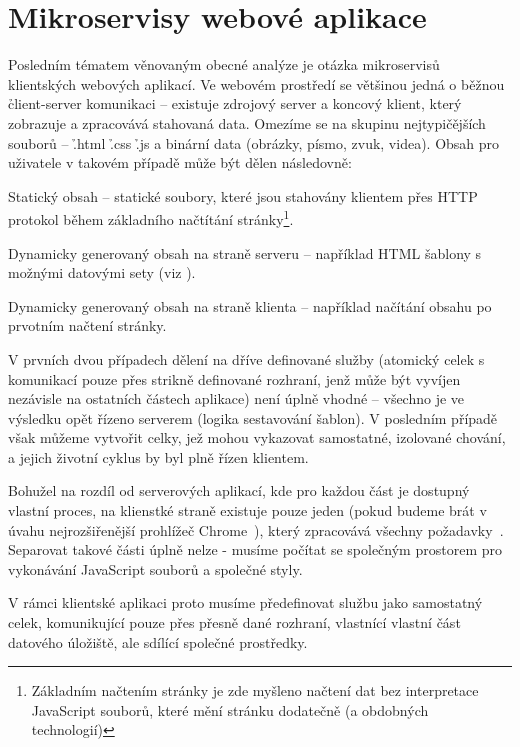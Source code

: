 
\section{Mikroservisy webové aplikace}\label{sec:msa-client}

Posledním tématem věnovaným obecné analýze  je otázka mikroservisů klientských webových aplikací.
Ve webovém prostředí se většinou jedná o běžnou \h{client-server} komunikaci – existuje zdrojový server a koncový klient, který zobrazuje a zpracovává stahovaná data.
Omezíme se na skupinu nejtypičějších souborů – \h{.html} \h{.css} \h{.js} a binární data (obrázky, písmo, zvuk, videa).
Obsah pro uživatele v takovém případě může být dělen následovně:

\begin{dl}
   \item[Statický obsah] – statické soubory, které jsou stahovány klientem přes HTTP protokol během základního načtítání stránky\footnote{Základním načtením stránky je zde myšleno načtení dat bez interpretace JavaScript souborů, které mění stránku dodatečně (a obdobných technologií)}.
   \item[Dynamicky generovaný obsah na straně serveru] – například HTML šablony s možnými datovými sety (viz ).
   \item[Dynamicky generovaný obsah na straně klienta] – například  načítání obsahu po prvotním načtení stránky.
\end{dl}

V prvních dvou případech dělení na dříve definované služby (atomický celek s komunikací pouze přes strikně definované rozhraní, jenž může být vyvíjen nezávisle na ostatních částech aplikace) není úplně vhodné – všechno je ve výsledku opět řízeno serverem (logika sestavování šablon).
V posledním případě však můžeme vytvořit celky, jež mohou vykazovat samostatné, izolované chování, a jejich životní cyklus by byl plně řízen klientem.

Bohužel na rozdíl od serverových aplikací, kde pro každou část je dostupný vlastní proces, na klienstké straně existuje pouze jeden (pokud budeme brát v úvahu nejrozšiřenější prohlížeč Chrome~\cite{browserstats}), který zpracovává všechny požadavky~\cite{chromiumprocesses}.
Separovat takové části úplně nelze - musíme počítat se společným prostorem pro vykonávání JavaScript souborů a společné  styly.

V rámci klientské aplikaci proto musíme předefinovat službu jako samostatný celek, komunikující pouze přes přesně dané rozhraní, vlastnící vlastní část datového úložiště, ale sdílící společné prostředky.

